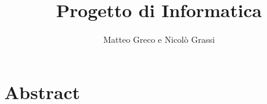\documentclass[a4paper, 12pt]{article}
\author{Matteo Greco e Nicol\`o Grassi}
\title{Progetto di Informatica}
\date{}
\begin{document}
\maketitle
\section*{Abstract}
\end{document}
